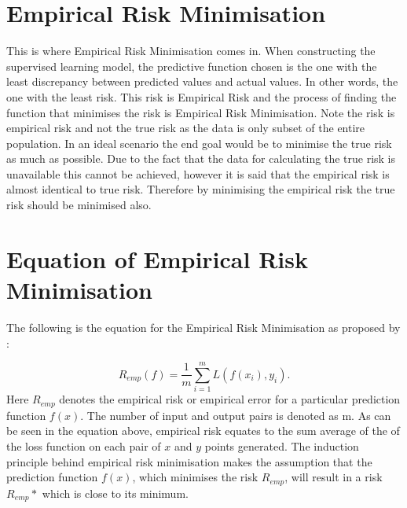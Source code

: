 \documentclass{article}
\begin{document}
\section{Empirical Risk Minimisation}
This is where Empirical Risk Minimisation comes in. When constructing the supervised learning model, the predictive function chosen is the one with the  least discrepancy between predicted values and actual values. In other words, the one with the least risk. This risk is Empirical Risk and the process of finding the function that minimises the risk is Empirical Risk Minimisation. Note the risk is empirical risk and not the true risk as the data is only subset of the entire population. In an ideal scenario the end goal would be to minimise the true risk as much as possible. Due to the fact that the data for calculating the true risk is unavailable this cannot be achieved, however it is said that the empirical risk is almost identical to true risk. Therefore by minimising the empirical risk the true risk should be minimised also.

\section{Equation of Empirical Risk Minimisation}

The following is the equation for the Empirical Risk Minimisation as proposed by \citet{Vapnik}\citep{principles}:

\begin{equation}
    R_{emp}(f) = \frac{1}{m} \sum_{i=1}^{m} L(f(x_{i})   ,y_{i}).
\end{equation}
Here $R_{emp}$ denotes the empirical risk or empirical error for a particular prediction function $f(x)$. The number of input and output pairs is denoted as m. As can be seen in the equation above, empirical risk equates to the sum average of the of the loss function on each pair of $x$ and $y$ points generated. The induction principle behind empirical risk minimisation makes the assumption that the prediction function $f(x)$, which minimises the risk $R_{emp}$, will result in a risk $R_{emp}*$ which is close to its minimum. 
\end{document}
